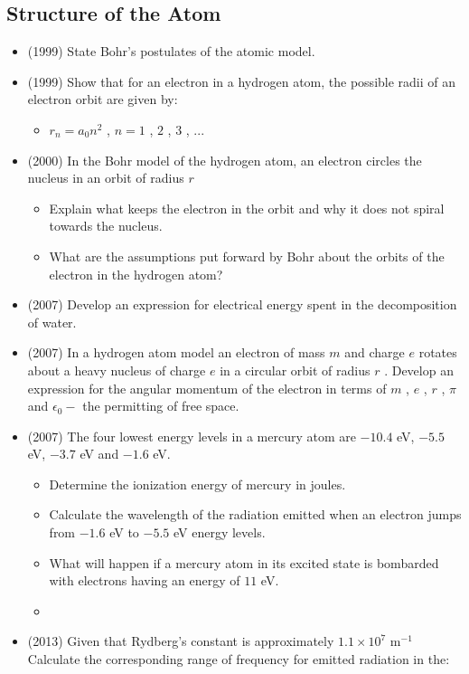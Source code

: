 \documentclass{article}
\begin{document}
\subsection{Structure of the Atom}
\begin{itemize}
\item (1999)  State Bohr’s postulates of the atomic model.
\item (1999)  Show that for an electron in a hydrogen atom, the possible radii of an electron orbit are given by:\begin{itemize}
\item $ r_{n}=a_{0}n^{2}$ , $ n=1$ , $ 2$ , $ 3$ , ...
\end{itemize}
\item (2000)  In the Bohr model of the hydrogen atom, an electron circles the nucleus in an orbit of radius $ r$\begin{itemize}
\item Explain what keeps the electron in the orbit and why it does not spiral towards the nucleus.
\item What are the assumptions put forward by Bohr about the orbits of the electron in the hydrogen atom?
\end{itemize}
\item (2007)  Develop an expression for electrical energy spent in the decomposition of water. 
\item (2007)  In a hydrogen atom model an electron of mass $ m$ and charge $ e$ rotates about a heavy nucleus of charge $ e$ in a circular orbit of radius $ r$ . Develop an expression for the angular momentum of the electron in terms of $ m$ , $ e$ , $ r$ , $ \pi$ and $ \epsilon  _{0}-$ the permitting of free space.
\item (2007)  The four lowest energy levels in a mercury atom are $ -10.4$ eV, $ -5.5$ eV, $ -3.7$ eV and $ -1.6$ eV.\begin{itemize}
\item Determine the ionization energy of mercury in joules. 
\item Calculate the wavelength of the radiation emitted when an electron jumps from $ -1.6$ eV to $ -5.5$ eV energy levels. 
\item What will happen if a mercury atom in its excited state is bombarded with electrons having an energy of $ 11$ eV. 
\item 
\end{itemize}
\item (2013)  Given that Rydberg’s constant is approximately $ 1.1 \times 10^{7}$ m$ ^{-1}$ Calculate the corresponding range of frequency for emitted radiation in the:\begin{itemize}

\end{itemize}
\end{itemize}
\end{document}
